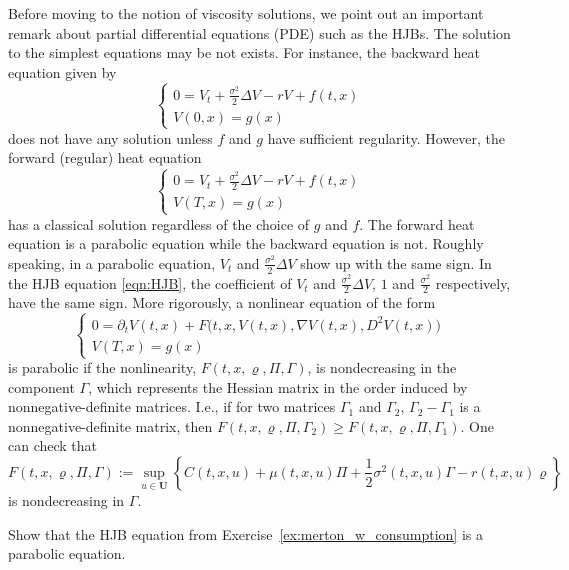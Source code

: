 \documentclass[11pt]{book}
\begin{document}
Before moving to the notion of viscosity solutions, we point out an important remark about partial differential equations (PDE) such as the HJBs. The solution to the simplest equations may be not exists. For instance, the backward heat equation given by
\begin{equation}
\begin{cases}
0={V}_{t}+\frac{\sigma^2}{2}\Delta V-rV+f(t,x)\\
V(0,x)=g(x)
\end{cases}
\end{equation}
does not have any solution unless $f$ and $g$ have sufficient regularity. However, the forward (regular) heat equation
\begin{equation}
\begin{cases}
0={V}_{t}+\frac{\sigma^2}{2}\Delta V-rV+f(t,x)\\
V(T,x)=g(x)
\end{cases}
\end{equation}
has a classical solution regardless of the choice of $g$ and $f$. The forward heat equation is a parabolic equation while the backward equation is not. Roughly speaking, in a parabolic equation, ${V}_{t}$ and $\frac{\sigma^2}{2}\Delta V$ show up with the same sign. In the HJB equation \eqref{eqn:HJB}, the coefficient of ${V}_{t}$ and $\frac{\sigma^2}{2}\Delta V$, $1$ and $\frac{\sigma^2}{2}$ respectively, have the same sign. More rigorously, a nonlinear equation of the form 
\begin{equation}\label{eqn:nonlinear_parabolic}
\begin{cases}
		0=\partial_{t}V(t,x)+F\big(t,x,V(t,x),\nabla V(t,x),D^2V(t,x)\big)\\
		V(T,x)=g(x)
\end{cases}
\end{equation}
is parabolic if the nonlinearity, $F(t,x,\varrho,\Pi,\Gamma)$, is nondecreasing in the component $\Gamma$, which represents the Hessian matrix in the order induced by nonnegative-definite matrices. I.e., if for two matrices $\Gamma_1$ and $\Gamma_2$, $\Gamma_2-\Gamma_1$ is a nonnegative-definite matrix, then $F(t,x,\varrho,\Pi,\Gamma_2)\ge F(t,x,\varrho,\Pi,\Gamma_1)$.
One can check that 
\begin{equation}
F(t,x,\varrho,\Pi,\Gamma):=\sup_{u\in \mathbf{U}}\left\{C(t,x,u)+\mu(t,x,u)\Pi+\frac12{\sigma^2(t,x,u)}\Gamma -r(t,x,u)\varrho\right\}
\end{equation}
is nondecreasing in $\Gamma$.

\begin{eg}
Show that the HJB equation from Exercise~\ref{ex:merton_w_consumption} is a parabolic equation.
\end{eg}
\end{document}

